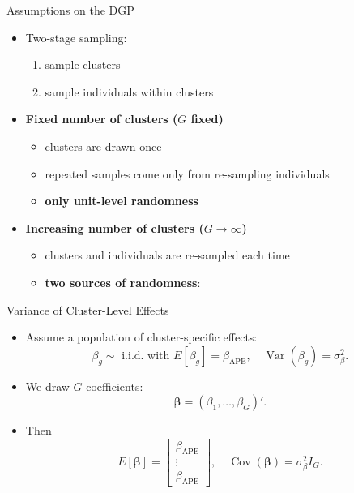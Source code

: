 \documentclass[
  ignorenonframetext,
]{beamer}
\providecommand{\tightlist}{%
  \setlength{\itemsep}{0pt}\setlength{\parskip}{0pt}}
\begin{document}
\begin{frame}{Assumptions on the DGP}
\label{assumptions-on-the-dgp}
\begin{itemize}
\tightlist
\item
  Two-stage sampling:

  \begin{enumerate}
  \tightlist
  \item
    sample clusters\\
  \item
    sample individuals within clusters
  \end{enumerate}
\item
  \textbf{Fixed number of clusters (\(G\) fixed)}

  \begin{itemize}
  \tightlist
  \item
    clusters are drawn once\\
  \item
    repeated samples come only from re-sampling individuals\\
  \item
    \textbf{only unit-level randomness}
  \end{itemize}
\item
  \textbf{Increasing number of clusters (\(G \to \infty\))}

  \begin{itemize}
  \tightlist
  \item
    clusters and individuals are re-sampled each time\\
  \item
    \textbf{two sources of randomness}:
  \end{itemize}
\end{itemize}
\end{frame}

\begin{frame}{Variance of Cluster-Level Effects}
\label{variance-of-cluster-level-effects}
\begin{itemize}
\tightlist
\item
  Assume a population of cluster-specific effects: \[
  \beta_g \sim \text{ i.i.d. with } 
  E[\beta_g] = \beta_{\text{APE}},\quad
  \operatorname{Var}(\beta_g) = \sigma^2_\beta.
  \]
\item
  We draw \(G\) coefficients: \[
  \boldsymbol{\beta} = (\beta_1,\dots,\beta_G)'.
  \]
\item
  Then \[
  E[\boldsymbol{\beta}] = 
  \begin{bmatrix}
  \beta_{\text{APE}} \\
  \vdots \\
  \beta_{\text{APE}}
  \end{bmatrix},\quad
  \operatorname{Cov}(\boldsymbol{\beta}) =
  \sigma^2_\beta I_G.
  \]
\end{itemize}
\end{frame}
\end{document}
